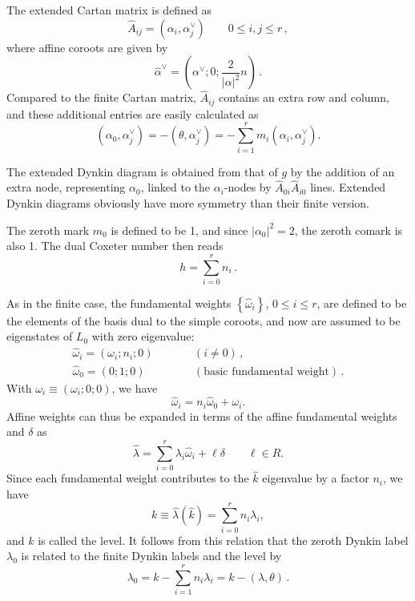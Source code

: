 \documentclass[a4paper,12pt]{report}
\begin{document}
The extended Cartan matrix is defined as
\begin{equation}
\widehat{A}_{ij}=\left(\alpha_{i},\alpha_{j}^{\vee}\right)\qquad 0\leq i,j\leq r\,,
\end{equation}
where affine coroots are given by
\begin{equation}
\hat{\alpha}^{\vee}=\left(\alpha^{\vee};0;\frac{2}{|\alpha|^{2}}n\right)\,.
\end{equation}
Compared to the finite Cartan matrix, $\widehat{A}_{ij}$ contains an extra row and column, and these additional
entries are easily calculated as
\begin{equation}
\left(\alpha_{0},\alpha_{j}^{\vee}\right)=-\left(\theta,\alpha_{j}^{\vee}\right)=-\sum_{i=1}^{r}m_{i}\left(\alpha_{i},\alpha_{j}^{\vee}\right).
\end{equation}

The extended Dynkin diagram is obtained from that of $g$ by the addition of an extra node, representing
$\alpha_{0}$, linked to the $\alpha_{i}$-nodes by $\widehat{A}_{0i}\widehat{A}_{i0}$ lines. Extended Dynkin
diagrams obviously have more symmetry than their finite version.

The zeroth mark $m_{0}$ is defined to be 1, and since $|\alpha_{0}|^{2}=2$, the zeroth comark is also 1. The dual
Coxeter number then reads
\begin{equation}\label{dualCox}
h=\sum_{i=0}^{r}n_{i}\,.
\end{equation}

As in the finite case, the fundamental weights $\left\{\hat{\omega}_{i}\right\}$, $0\leq i\leq r$, are defined to
be the elements of the basis dual to the simple coroots, and now are assumed to be eigenstates of $L_{0}$ with
zero eigenvalue:
\begin{eqnarray}
\hat{\omega}_{i}=\left(\omega_{i};n_{i};0\right) &\qquad& (i\neq 0)\,,\\
\hat{\omega}_{0}=\left(0;1;0\right)&\qquad &(\textrm{basic fundamental weight})\,.
\end{eqnarray}
With $\omega_{i}\equiv(\omega_{i};0;0)$, we have
\begin{equation}
\hat{\omega}_{i}=n_{i}\hat{\omega}_{0}+\omega_{i}.
\end{equation}
Affine weights can thus be expanded in terms of the affine fundamental weights and $\delta$ as
\begin{equation}
\hat{\lambda}=\sum_{i=0}^{r}\lambda_{i}\hat{\omega}_{i}+\ell\delta\qquad\ell\in R.
\end{equation}
Since each fundamental weight contributes to the $\hat{k}$ eigenvalue by a factor $n_{i}$, we have
\begin{equation}
k\equiv\hat{\lambda}(\hat{k})=\sum_{i=0}^{r}n_{i}\lambda_{i},
\end{equation}
and $k$ is called the level. It follows from this relation that the zeroth Dynkin label $\lambda_{0}$ is related
to the finite Dynkin labels and the level by
\begin{equation}
\lambda_{0}=k-\sum_{i=1}^{r}n_{i}\lambda_{i}=k-(\lambda,\theta)\,.
\end{equation}
\end{document}
